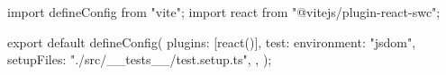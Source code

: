 import { defineConfig } from "vite";
import react from "@vitejs/plugin-react-swc";

export default defineConfig({
  plugins: [react()],
  test: {
    environment: "jsdom",
    setupFiles: "./src/__tests__/test.setup.ts",
  },
});
